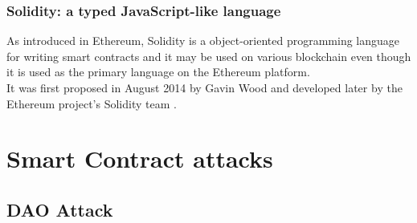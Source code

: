 \subsubsection{Solidity: a typed JavaScript-like language}
As introduced in Ethereum, Solidity is a object-oriented programming language for writing smart contracts and it may be used on various blockchain even though it is used as the primary language on the Ethereum platform.
\\It was first proposed in August 2014 by Gavin Wood and developed later by the Ethereum project's Solidity team \cite{solidity}.

\section{Smart Contract attacks}
\subsection{DAO Attack}
